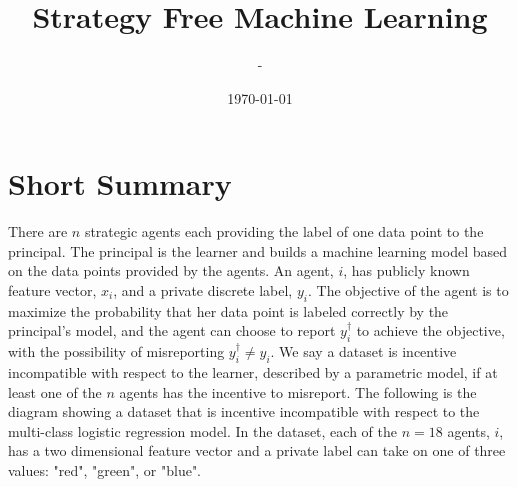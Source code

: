\documentclass{article}
\title{Strategy Free Machine Learning}
\author{-}
\date{\today}
\begin{document}
\newtheorem{thm}{Theorem}
\newtheorem{cor}{Corollary}
\newtheorem{lem}{Lemma}
\newtheorem{prop}{Proposition}
\newtheorem{conj}{Conjecture}
\newtheorem{algo}{Algorithm}
\newtheorem{obs}{Observation}
\newtheorem{clm}{Claim}
\theoremstyle{definition}
\newtheorem{df}{Definition}
\newtheorem{eg}{Example}
\newtheorem{asm}{Assumption}
\newtheorem{cond}{Condition}
\theoremstyle{remark}
\newtheorem{rmk}{Remark}
\maketitle \onehalfspacing \allowdisplaybreaks \raggedbottom


\section{Short Summary} 
There are $n $ strategic agents each providing the label of one data point to the principal. The principal is the learner and builds a machine learning model based on the data points provided by the agents. An agent, $i $, has publicly known feature vector, $x_{i}$, and a private discrete label, $y_{i}$. The objective of the agent is to maximize the probability that her data point is labeled correctly by the principal's model, and the agent can choose to report $y^{\dagger}_{i}$ to achieve the objective, with the possibility of misreporting $y^{\dagger}_{i} \neq  y_{i}$. We say a dataset is incentive incompatible with respect to the learner, described by a parametric model, if at least one of the $n $ agents has the incentive to misreport.
\newline \newline
The following is the diagram showing a dataset that is incentive incompatible with respect to the multi-class logistic regression model. In the dataset, each of the $n  = 18$ agents, $i $, has a two dimensional feature vector and a private label can take on one of three values: "red", "green", or "blue".
\newline \newline
\end{document}
